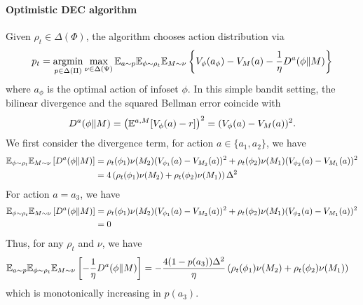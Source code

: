 \paragraph{Optimistic DEC algorithm \citep{foster2024model}}
Given $\rho_t \in \Delta(\Phi)$, the algorithm chooses action distribution via
\begin{align}
    p_t = \operatorname*{argmin}_{p \in \Delta(\Pi)} \max_{\nu \in \Delta(\Psi)} \mathbb{E}_{a\sim p} \mathbb{E}_{\phi\sim \rho_t} \mathbb{E}_{M\sim \nu} \left\{V_{\phi}(a_{\phi}) - V_M(a) - \frac{1}{\eta} D^{a}(\phi \| M) \right\}
\label{eq:dec-three}
\end{align}
where $a_{\phi}$ is the optimal action of infoset $\phi$. In this simple bandit setting, the bilinear divergence and the squared Bellman error coincide with
\begin{align*} 
 D^a(\phi\| M) = \left(\mathbb{E}^{a, M} [V_\phi(a) - r]\right)^2 = (V_\phi(a) - V_M(a))^2. 
\end{align*}
We first consider the divergence term, for action $a \in \{a_1, a_2\}$, we have
\begin{align}
    \mathbb{E}_{\phi \sim \rho_t}\mathbb{E}_{M \sim \nu}\left[D^a(\phi \| M)\right] &= \rho_t(\phi_1)\nu(M_2)(V_{\phi_1}(a) - V_{M_2}(a))^2 +  \rho_t(\phi_2)\nu(M_1)(V_{\phi_2}(a) - V_{M_1}(a))^2 \nonumber
    \\&= 4\left(\rho_t(\phi_1)\nu(M_2) + \rho_t(\phi_2)\nu(M_1)\right)\Delta^2 \label{eq:D12}
\end{align}
For action $a = a_3$, we have
\begin{align}
    \mathbb{E}_{\phi \sim \rho_t}\mathbb{E}_{M \sim \nu}\left[D^a(\phi\| M)\right] &= \rho_t(\phi_1)\nu(M_2)(V_{\phi_1}(a) - V_{M_2}(a))^2 +  \rho_t(\phi_2)\nu(M_1)(V_{\phi_2}(a) - V_{M_1}(a))^2 \nonumber
    \\&= 0 
    \label{eq:D3}
\end{align}
Thus, for any $\rho_t$ and $\nu$, we have
\begin{align*}
\mathbb{E}_{a \sim p}\mathbb{E}_{\phi\sim \rho_t} \mathbb{E}_{M\sim \nu}\left[ - \frac{1}{\eta} D^{a}(\phi\|M)\right]  &= -\frac{4(1-p(a_3))\Delta^2}{\eta}\left(\rho_t(\phi_1)\nu(M_2) + \rho_t(\phi_2)\nu(M_1)\right) 
\end{align*}
which is monotonically increasing in $p(a_3)$. 

